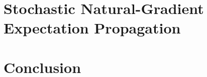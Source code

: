 \ifpbp\fi

\chapter[SNEP]{Stochastic Natural-Gradient\\ Expectation Propagation}
\ifsnep\fi

\chapter{Conclusion}




\appendix{}




\newpage
\renewcommand{\bibname}{References}

\begin{footnotesize}

\end{footnotesize}

